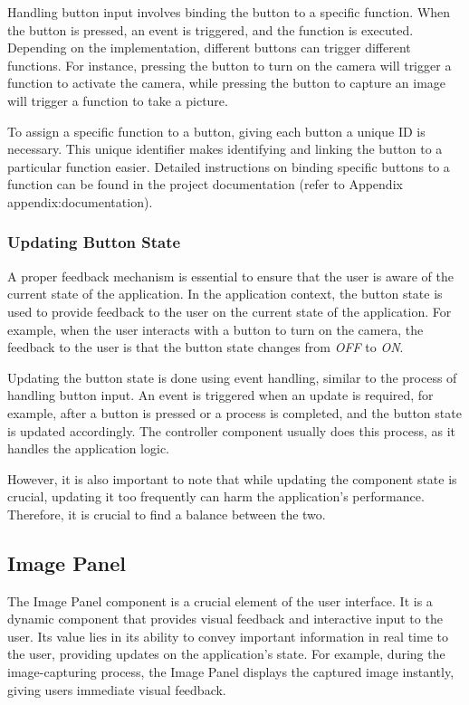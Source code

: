 Handling button input involves binding the button to a specific function. When the button is pressed, an event is triggered, and the function is executed. Depending on the implementation, different buttons can trigger different functions. For instance, pressing the button to turn on the camera will trigger a function to activate the camera, while pressing the button to capture an image will trigger a function to take a picture.

To assign a specific function to a button, giving each button a unique ID is necessary. This unique identifier makes identifying and linking the button to a particular function easier. Detailed instructions on binding specific buttons to a function can be found in the project documentation (refer to Appendix {appendix:documentation}).

\subsubsection{Updating Button State}
A proper feedback mechanism is essential to ensure that the user is aware of the current state of the application. In the application context, the button state is used to provide feedback to the user on the current state of the application. For example, when the user interacts with a button to turn on the camera, the feedback to the user is that the button state changes from \textit{OFF} to \textit{ON}.

Updating the button state is done using event handling, similar to the process of handling button input. An event is triggered when an update is required, for example, after a button is pressed or a process is completed, and the button state is updated accordingly. The controller component usually does this process, as it handles the application logic.

However, it is also important to note that while updating the component state is crucial, updating it too frequently can harm the application's performance. Therefore, it is crucial to find a balance between the two.

\subsection{Image Panel}
\label{subsec:image_panel}
The Image Panel component is a crucial element of the user interface. It is a dynamic component that provides visual feedback and interactive input to the user. Its value lies in its ability to convey important information in real time to the user, providing updates on the application's state. For example, during the image-capturing process, the Image Panel displays the captured image instantly, giving users immediate visual feedback.

